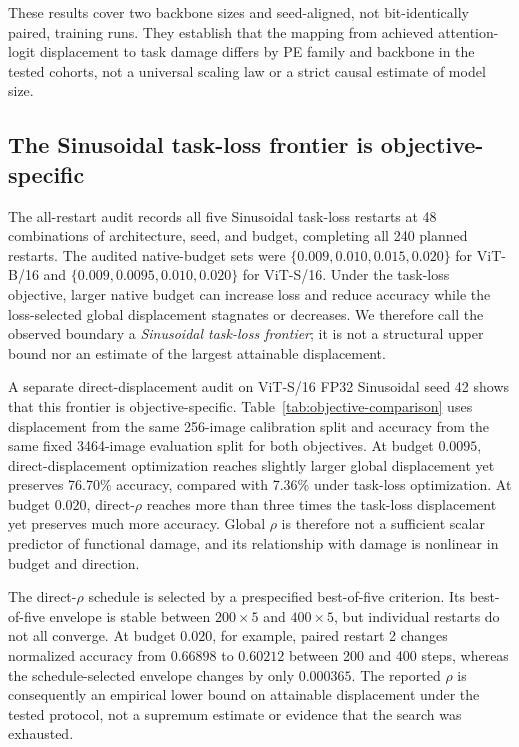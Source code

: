 \documentclass[preprint,12pt,authoryear]{elsarticle}
\begin{document}
These results cover two backbone sizes and seed-aligned, not
bit-identically paired, training runs. They establish that the mapping
from achieved attention-logit displacement to task damage differs by PE
family and backbone in the tested cohorts, not a universal scaling law or
a strict causal estimate of model size.

\subsection{The Sinusoidal task-loss frontier is objective-specific}
\label{sec:sinusoidal-frontier}

The all-restart audit records all five Sinusoidal task-loss restarts at 48
combinations of architecture, seed, and budget, completing all 240
planned restarts. The audited native-budget sets were
$\{0.009,0.010,0.015,0.020\}$ for ViT-B/16 and
$\{0.009,0.0095,0.010,0.020\}$ for ViT-S/16.
Under the task-loss objective, larger native budget can increase loss and
reduce accuracy while the loss-selected global displacement stagnates or
decreases. We therefore call the observed boundary a
\emph{Sinusoidal task-loss frontier}; it is not a structural upper bound
nor an estimate of the largest attainable displacement.

A separate direct-displacement audit on ViT-S/16 FP32 Sinusoidal seed 42
shows that this frontier is objective-specific. Table~\ref{tab:objective-comparison}
uses displacement from the same 256-image calibration split and accuracy
from the same fixed 3464-image evaluation split for both objectives.
At budget $0.0095$, direct-displacement optimization reaches slightly larger
global displacement yet preserves 76.70\% accuracy, compared with 7.36\%
under task-loss optimization. At budget $0.020$, direct-$\rho$ reaches
more than three times the task-loss displacement yet preserves much more
accuracy. Global $\rho$ is therefore not a sufficient scalar predictor
of functional damage, and its relationship with damage is nonlinear in
budget and direction.



The direct-$\rho$ schedule is selected by a prespecified best-of-five
criterion. Its best-of-five envelope is stable between $200\times5$ and
$400\times5$, but individual restarts do not all converge. At budget $0.020$,
for example, paired restart 2 changes normalized accuracy from $0.66898$ to
$0.60212$ between 200 and 400 steps, whereas the schedule-selected envelope
changes by only $0.000365$. The reported $\rho$ is consequently an empirical
lower bound on attainable displacement under the tested protocol, not a
supremum estimate or evidence that the search was exhausted.
\end{document}
